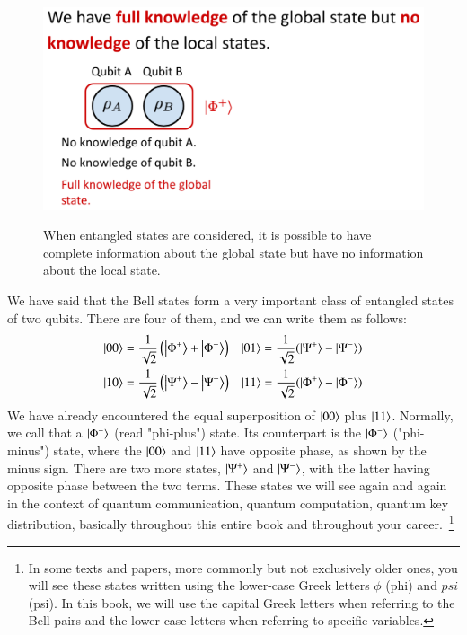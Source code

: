 \begin{figure}[H]
    \centering
    \includegraphics[width=1.0\textwidth]{lesson4/4.3_Recap.pdf}
    \label{fig: 1}
    \begin{center}
        \caption{When entangled states are considered, it is possible to have complete information about the global state but have no information about the local state.}
    \end{center}
\end{figure}


We have said that the Bell states form a very important class of entangled states of two qubits. There are four of them, and we can write them as follows: 
\begin{equation}
\begin{aligned}
|00\rangle &=\frac{1}{\sqrt{2}}\left(\left|\Phi^{+}\right\rangle+\left|\Phi^{-}\right\rangle\right) & 
\ket{01} = \frac{1}{\sqrt2}(\ket{\Psi^{+}} - \ket{\Psi^{-}}) \\
|10\rangle &=\frac{1}{\sqrt{2}}\left(\left|\Psi^{+}\right\rangle-\left|\Psi^{-}\right\rangle\right) & 
\ket{11} = \frac{1}{\sqrt2}(\ket{\Phi^{+}} - \ket{\Phi^{-}})
\end{aligned}
\end{equation}
We have already encountered the equal superposition of $\ket{00}$ plus $\ket{11}$. Normally, we call that a $\ket{\Phi^+}$ (read "phi-plus") state. Its counterpart is the $\ket{\Phi^-}$ ("phi-minus") state, where the $\ket{00}$ and $\ket{11}$ have opposite phase, as shown by the minus sign. There are two more states, $\ket{\Psi^+}$ and $\ket{\Psi^-}$, with the latter having opposite phase between the two terms.  These states we will see again and again in the context of quantum communication, quantum computation, quantum key distribution, basically throughout this entire book and throughout your career.~\footnote{In some texts and papers, more commonly but not exclusively older ones, you will see these states written using the lower-case Greek letters $\phi$ (phi) and $psi$ (psi).  In this book, we will use the capital Greek letters when referring to the Bell pairs and the lower-case letters when referring to specific variables.} 

